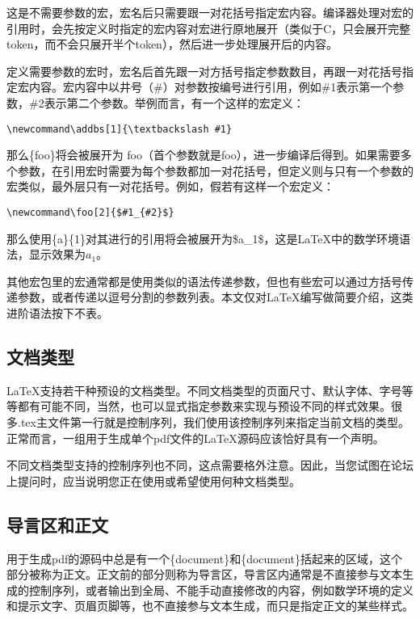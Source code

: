 这是不需要参数的宏，宏名后只需要跟一对花括号指定宏内容。编译器处理对宏的引用时，会先按定义时指定的宏内容对宏进行原地展开（类似于C，只会展开完整token，而不会只展开半个token），然后进一步处理展开后的内容。

定义需要参数的宏时，宏名后首先跟一对方括号指定参数数目，再跟一对花括号指定宏内容。宏内容中以井号（\#）对参数按编号进行引用，例如\#1表示第一个参数，\#2表示第二个参数。举例而言，有一个这样的宏定义：

\begin{lstlisting}[style = latex_texworks, numbers = none]
\newcommand\addbs[1]{\textbackslash #1}
\end{lstlisting}

那么\{foo\}将会被展开为 foo（首个参数就是foo），进一步编译后得到。如果需要多个参数，在引用宏时需要为每个参数都加一对花括号，但定义则与只有一个参数的宏类似，最外层只有一对花括号。例如，假若有这样一个宏定义：

\begin{lstlisting}[style = latex_texworks, numbers = none]
\newcommand\foo[2]{$#1_{#2}$}
\end{lstlisting}

那么使用\{a\}\{1\}对其进行的引用将会被展开为\$a\_1\$，这是\LaTeX 中的数学环境语法，显示效果为$a_1$。

其他宏包里的宏通常都是使用类似的语法传递参数，但也有些宏可以通过方括号传递参数，或者传递以逗号分割的参数列表。本文仅对\LaTeX 编写做简要介绍，这类进阶语法按下不表。

\subsection{文档类型}

\LaTeX 支持若干种预设的文档类型。不同文档类型的页面尺寸、默认字体、字号等等都有可能不同，当然，也可以显式指定参数来实现与预设不同的样式效果。很多.tex主文件第一行就是控制序列，我们使用该控制序列来指定当前文档的类型。正常而言，一组用于生成单个pdf文件的\LaTeX 源码应该恰好具有一个声明。

不同文档类型支持的控制序列也不同，这点需要格外注意。因此，当您试图在论坛上提问时，应当说明您正在使用或希望使用何种文档类型。

\subsection{导言区和正文}

用于生成pdf的源码中总是有一个\{document\}和\{document\}括起来的区域，这个部分被称为正文。正文前的部分则称为导言区，导言区内通常是不直接参与文本生成的控制序列，或者输出到全局、不能手动直接修改的内容，例如数学环境的定义和提示文字、页眉页脚等，也不直接参与文本生成，而只是指定正文的某些样式。

